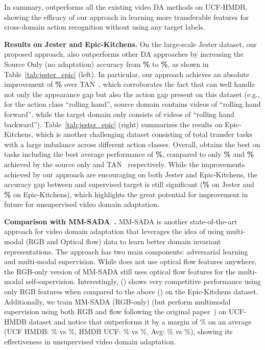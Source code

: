 In summary, \ours outperforms all the existing video DA methods on UCF-HMDB, showing the efficacy of our approach in learning more transferable features for cross-domain action recognition without using any target labels. 

\textbf{Results on Jester and Epic-Kitchens.} On the large-scale Jester dataset, our proposed approach, \ours also outperforms other DA approaches by increasing the Source Only (no adaptation) accuracy from \textbf{\%} to \textbf{\%}, as shown in Table~\ref{tab:jester_epic} (left). In particular, our approach achieves an absolute improvement of \textbf{\%} over TA\textsuperscript{}N~\cite{chen2019temporal}, which corroborates the fact that \ours can well handle not only the appearance gap but also the action gap present on this dataset (e.g., for the action class \enquote{rolling hand}, source domain contains videos of \enquote{rolling hand forward}, while the target domain only consists of videos of \enquote{rolling hand backward}).
Table~\ref{tab:jester_epic} (right) summarizes the results on Epic-Kitchens, which is another challenging dataset consisting of total  transfer tasks with a large imbalance across different action classes. Overall, \ours obtains the best on  tasks including the best average performance of \textbf{\%}, compared to only \textbf{\%} and \textbf{\%} achieved by the source only and TA\textsuperscript{}N~\cite{chen2019temporal} respectively. While the improvements achieved by our approach are encouraging on both Jester and Epic-Kitchens, the accuracy gap between \ours and supervised target is still significant (\textbf{\%} on Jester and \textbf{\%} on Epic-Kitchens), which highlights the great potential for improvement in future for unsupervised video domain adaptation. 

\textbf{Comparison with MM-SADA~\cite{munro2020multi}.} MM-SADA\cite{munro2020multi} is another state-of-the-art approach for video domain adaptation that leverages the idea of using multi-modal (RGB and Optical flow) data to learn better domain invariant representations. The approach has two main components: adversarial learning and multi-modal supervision. While \ours does not use optical flow features anywhere, the RGB-only version of MM-SADA still uses optical flow features for the multi-modal self-supervision. Interestingly, \ours () shows very competitive performance using only RGB features when compared to the above () on the Epic-Kitchens dataset. Additionally, we train MM-SADA (RGB-only) (but perform multimodal supervision using both RGB and flow following the original paper~\cite{munro2020multi}) on UCF-HMDB dataset and notice that \ours outperforms it by a margin of \% on an average (UCF  HMDB: \% vs \%, HMDB  UCF: \% vs \%, Avg: \% vs \%), showing its effectiveness in unsupervised video domain adaptation.

